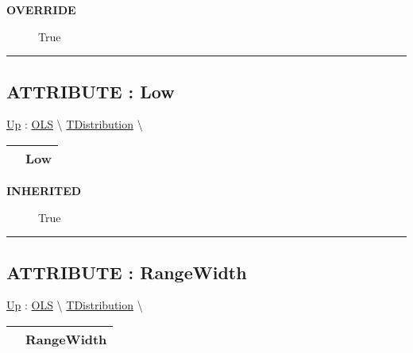 \par

\par
\begin{description}
\item [\textbf{OVERRIDE}] True
\end{description}

\rule{\linewidth}{0.5pt}
\subsection*{ATTRIBUTE : Low}
\hypertarget{ecldoc:linearregression.ols.tdistribution.low}{}
\hyperlink{ecldoc:linearregression.ols.tdistribution}{Up} :
\hspace{0pt} \hyperlink{ecldoc:linearregression.ols}{OLS} \textbackslash 
\hspace{0pt} \hyperlink{ecldoc:linearregression.ols.tdistribution}{TDistribution} \textbackslash 

{\renewcommand{\arraystretch}{1.5}
\begin{tabularx}{\textwidth}{|>{\raggedright\arraybackslash}l|X|}
\hline
\hspace{0pt} & Low \\
\hline
\end{tabularx}
}

\par

\par
\begin{description}
\item [\textbf{INHERITED}] True
\end{description}

\rule{\linewidth}{0.5pt}
\subsection*{ATTRIBUTE : RangeWidth}
\hypertarget{ecldoc:linearregression.ols.tdistribution.rangewidth}{}
\hyperlink{ecldoc:linearregression.ols.tdistribution}{Up} :
\hspace{0pt} \hyperlink{ecldoc:linearregression.ols}{OLS} \textbackslash 
\hspace{0pt} \hyperlink{ecldoc:linearregression.ols.tdistribution}{TDistribution} \textbackslash 

{\renewcommand{\arraystretch}{1.5}
\begin{tabularx}{\textwidth}{|>{\raggedright\arraybackslash}l|X|}
\hline
\hspace{0pt} & RangeWidth \\
\hline
\end{tabularx}
}

